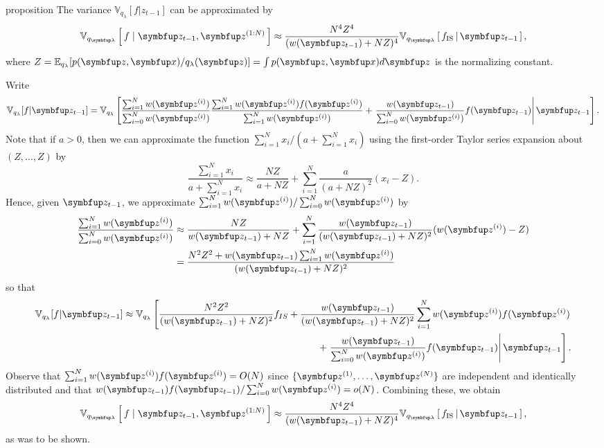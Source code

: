 
\begin{theoremEnd}{proposition}\label{thm:approx_var}
  The variance $\mathbb{V}_{q_\lambda}[f|z_{t-1}]$ can be approximated by
  \begin{align}
    \Vsub{q_{\vlambda}}{  f \mid \vz_{t-1}, \vz^{(1:N)} } \approx \frac{N^4 Z^4}{(w(\vz_{t-1}) + NZ)^4} \Vsub{q_{\vlambda}}{ f_{\text{IS}} \,\middle\vert\, \vz_{t-1} },
  \end{align}
  where $Z=\mathbb{E}_{q_\lambda}[p(\vz,\vx)/q_{\lambda}(\vz)]=\int p(\vz,\vx)d\vz$ is the normalizing constant.
\end{theoremEnd}

\begin{proofEnd}
  Write
  \begin{align}
  \mathbb{V}_{q_\lambda}[f|\vz_{t-1}] = \mathbb{V}_{q_\lambda}\left[\frac{\sum_{i=1}^N w(\vz^{(i)})}{\sum_{i=0}^N w(\vz^{(i)})} \frac{\sum_{i=1}^N w(\vz^{(i)})f(\vz^{(i)})}{\sum_{i=1}^N w(\vz^{(i)})} + \left.\frac{w(\vz_{t-1})}{\sum_{i=0}^N w(\vz^{(i)})} f(\vz_{t-1})  \right\vert \vz_{t-1} \right].
  \end{align}
  Note that if $a>0$, then we can approximate the function $\sum_{i=1}^N x_i/(a+\sum_{i=1}^N x_i)$ using the first-order Taylor series expansion about $(Z,\dots,Z)$ by
  $$
  \frac{\sum_{i=1}^N x_i}{a+\sum_{i=1}^N x_i} \approx \frac{NZ}{a+NZ}+\sum_{i=1}^N \frac{a}{(a+NZ)^2} (x_i -Z).
  $$
  Hence, given $\vz_{t-1}$, we approximate $\sum_{i=1}^N w(\vz^{(i)})/\sum_{i=0}^N w(\vz^{(i)})$ by
  \begin{align}
  \frac{\sum_{i=1}^N w(\vz^{(i)})}{\sum_{i=0}^N w(\vz^{(i)})} &\approx \frac{NZ}{w(\vz_{t-1})+NZ} + \sum_{i=1}^N \frac{w(\vz_{t-1})}{(w(\vz_{t-1})+ NZ)^2} (w(\vz^{(i)})-Z) \\
    & = \frac{N^2 Z^2 + w(\vz_{t-1}) \sum_{i=1}^N w(\vz^{(i)})}{(w(\vz_{t-1})+NZ)^2}
  \end{align}
  so that
  \begin{align}
  \mathbb{V}_{q_\lambda}[f|\vz_{t-1}] \approx \mathbb{V}_{q_\lambda} \left[\frac{N^2Z^2}{(w(\vz_{t-1})+NZ)^2} f_{IS} + \frac{w(\vz_{t-1})}{(w(\vz_{t-1})+NZ)^2}\sum_{i=1}^N w(\vz^{(i)})f(\vz^{(i)})\right. \\ \left.
  + \left. \frac{w(\vz_{t-1})}{\sum_{i=0}^N w(\vz^{(i)})} f(\vz_{t-1}) \right\vert \vz_{t-1} \right].
  \end{align}
  Observe that $\sum_{i=1}^N w(\vz^{(i)}) f(\vz^{(i)}) = O(N)$ since $\{\vz^{(1)}, \dots, \vz^{(N)}\}$ are independent and identically distributed and that $w(\vz_{t-1})f(\vz_{t-1})/\sum_{i=0}^N w(\vz^{(i)})=o(N)$.
  Combining these, we obtain
  \begin{align}
    \Vsub{q_{\vlambda}}{  f \mid \vz_{t-1}, \vz^{(1:N)} } \approx \frac{N^4 Z^4}{(w(\vz_{t-1}) + NZ)^4} \Vsub{q_{\vlambda}}{ f_{\text{IS}} \,\middle\vert\, \vz_{t-1} },
  \end{align}
  as was to be shown.
\end{proofEnd}

